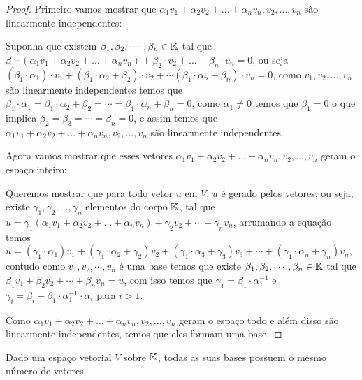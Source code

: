 \begin{proof}
Primeiro vamos mostrar que $\alpha_1v_1 + \alpha_2v_2 +\dots + \alpha_nv_n, v_2,\dots,v_n $ são linearmente independentes:

Suponha que existem $\beta_1,\beta_2,\cdots,\beta_n \in \mathbb{K}$ tal que $\beta_1 \cdot (\alpha_1v_1 + \alpha_2v_2 +\dots + \alpha_n v_n) + \beta_2 \cdot v_2 + \dots + \beta_n \cdot  v_n = 0$, ou seja $ (\beta_1 \cdot \alpha_1) \cdot v_1 + (\beta_1 \cdot \alpha_2 + \beta_2)\cdot v_2 + \cdots (\beta_1 \cdot \alpha_n + \beta_n)\cdot v_n = 0$, como $v_1,v_2,\dots,v_n$ são linearmente independentes temos que $\beta_1 \cdot \alpha_1 = \beta_1 \cdot \alpha_2 + \beta_2 = \cdots = \beta_1 \cdot \alpha_n + \beta_n = 0$, como $\alpha_1 \ne 0$ temos que $\beta_1 = 0$ o que implica $\beta_2 = \beta_3 = \cdots = \beta_n = 0$, e assim temos que  $\alpha_1v_1 + \alpha_2v_2 +\dots + \alpha_nv_n, v_2,\dots,v_n$ são linearmente independentes.

Agora vamos mostrar que esses vetores $\alpha_1v_1 + \alpha_2v_2 +\dots + \alpha_nv_n, v_2,\dots,v_n $ geram o espaço inteiro:

Queremos mostrar que para todo vetor $u$  em $V$, $u$ é gerado pelos vetores, ou seja, existe $\gamma_1,\gamma_2, \dots, \gamma_n$ elementos do corpo
$\mathbb{K}$, tal que $u = \gamma_1  (\alpha_1v_1 + \alpha_2v_2 +\dots + \alpha_nv_n) + \gamma_2 v_2 + \cdots + \gamma_n v_n$, arrumando a equação temos $u = (\gamma_1 \cdot \alpha_1) v_1 + (\gamma_1 \cdot \alpha_2 + \gamma_2) v_2 + (\gamma_1 \cdot \alpha_3 + \gamma_3) v_3 + \cdots + (\gamma_1 \cdot \alpha_n + \gamma_n) v_n$, contudo como $v_1,v_2,\cdots,v_n$ é uma base temos que existe $\beta_1,\beta_2,\cdots,\beta_n \in \mathbb{K}$ tal que $\beta_1 v_1 + \beta_2 v_2 + \cdots + \beta_n v_n = u$, com isso temos que
$\gamma_1 = \beta_1 \cdot \alpha_1^{-1}$ e $\gamma_i = \beta_i - \beta_1 \cdot \alpha_1^{-1} \cdot \alpha_i$ para $i>1$.

Como $\alpha_1v_1 + \alpha_2v_2 +\dots + \alpha_nv_n, v_2,\dots,v_n$ geram o espaço todo e além disso são linearmente independentes, temos que eles formam uma base.
\end{proof} 

\newpage

\begin{thm}
Dado um espaço vetorial $V$ sobre $\mathbb{K}$, todas as suas bases possuem o mesmo número de vetores.
\end{thm}


